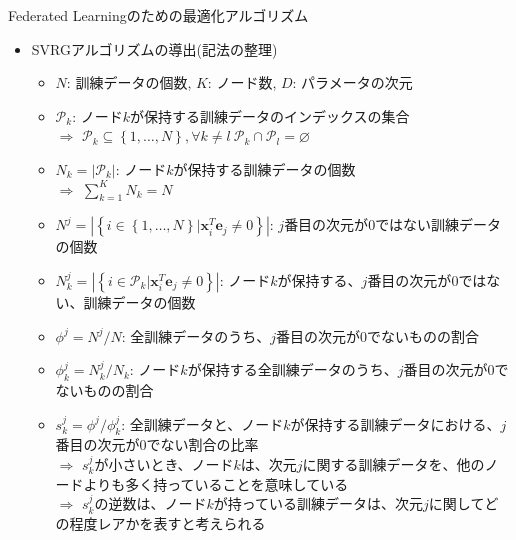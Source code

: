 \documentclass[dvipdfmx,notheorems,t]{beamer}
\begin{document}
\begin{frame}{Federated Learningのための最適化アルゴリズム}

\begin{itemize}
	\item SVRGアルゴリズムの導出(記法の整理)
	\begin{itemize}
		\item $N$: 訓練データの個数, $K$: ノード数, $D$: パラメータの次元
		\newline
		
		\item $\mathcal{P}_k$: ノード$k$が保持する訓練データのインデックスの集合 \\
		$\Rightarrow$ $\mathcal{P}_k \subseteq \left\{ 1, \ldots, N \right\}, \forall k \neq l \ \mathcal{P}_k \cap \mathcal{P}_l = \varnothing$ \\
		\item $N_k = |\mathcal{P}_k|$: ノード$k$が保持する訓練データの個数 \\
		$\Rightarrow$ $\sum_{k = 1}^K N_k = N$
		\newline
		
		\item $N^j = \left| \left\{ i \in \left\{ 1, \ldots, N \right\} | \bm{x}_i^T \bm{e}_j \neq 0 \right\} \right|$: $j$番目の次元が$0$ではない訓練データの個数
		\item $N_k^j = \left| \left\{ i \in \mathcal{P}_k | \bm{x}_i^T \bm{e}_j \neq 0 \right\} \right|$: ノード$k$が保持する、$j$番目の次元が$0$ではない、訓練データの個数
		\newline
		
		\item $\phi^j = N^j / N$: 全訓練データのうち、$j$番目の次元が$0$でないものの割合
		\item $\phi_k^j = N_k^j / N_k$: ノード$k$が保持する全訓練データのうち、$j$番目の次元が$0$でないものの割合
		
		\framebreak
		
		\item $s_k^j = \phi^j / \phi_k^j$: 全訓練データと、ノード$k$が保持する訓練データにおける、$j$番目の次元が$0$でない割合の比率 \\
		$\Rightarrow$ $s_k^j$が小さいとき、ノード$k$は、次元$j$に関する訓練データを、他のノードよりも多く持っていることを意味している \\
		$\Rightarrow$ $s_k^j$の逆数は、ノード$k$が持っている訓練データは、次元$j$に関してどの程度レアかを表すと考えられる
		\newline
		

\end{itemize}
\end{itemize}
\end{frame}
\end{document}
